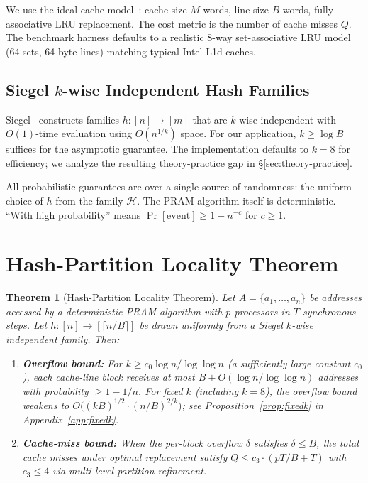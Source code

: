 \documentclass[11pt]{article}
\newtheorem{theorem}{Theorem}
\begin{document}
We use the ideal cache model~\cite{frigo1999cache}: cache size $M$ words,
line size $B$ words, fully-associative LRU replacement.  The cost metric
is the number of cache misses $Q$.  The benchmark harness defaults to a
realistic 8-way set-associative LRU model (64 sets, 64-byte lines)
matching typical Intel L1d caches.

\subsection{Siegel $k$-wise Independent Hash Families}

Siegel~\cite{siegel2004universal} constructs families $h: [n] \to [m]$
that are $k$-wise independent with $O(1)$-time evaluation using
$O(n^{1/k})$ space.  For our application, $k \ge \log B$ suffices for
the asymptotic guarantee.  The implementation defaults to $k = 8$ for
efficiency; we analyze the resulting theory-practice gap in
\S\ref{sec:theory-practice}.

All probabilistic guarantees are over a single source of randomness: the
uniform choice of $h$ from the family $\mathcal{H}$.  The PRAM algorithm
itself is deterministic.  ``With high probability'' means
$\Pr[\text{event}] \ge 1 - n^{-c}$ for $c \ge 1$.

\section{Hash-Partition Locality Theorem}
\label{sec:theory}

\begin{theorem}[Hash-Partition Locality Theorem]
\label{thm:hplt}
Let $A = \{a_1, \ldots, a_n\}$ be addresses accessed by a deterministic
PRAM algorithm with $p$ processors in $T$ synchronous steps.  Let
$h: [n] \to [\lceil n/B \rceil]$ be drawn uniformly from a Siegel
$k$-wise independent family.  Then:
\begin{enumerate}
\item \textbf{Overflow bound:} For $k \ge c_0 \log n / \log\log n$
  (a sufficiently large constant $c_0$), each cache-line block receives
  at most $B + O(\log n / \log\log n)$ addresses with probability
  $\ge 1 - 1/n$.  For fixed $k$ (including $k = 8$), the overflow
  bound weakens to $O\bigl((kB)^{1/2} \cdot (n/B)^{2/k}\bigr)$;
  see Proposition~\ref{prop:fixedk} in Appendix~\ref{app:fixedk}.
\item \textbf{Cache-miss bound:} When the per-block overflow $\delta$
  satisfies $\delta \le B$, the total cache misses under optimal
  replacement satisfy $Q \le c_3 \cdot (pT/B + T)$ with $c_3 \le 4$
  via multi-level partition refinement.
\end{enumerate}
\end{theorem}
\end{document}
